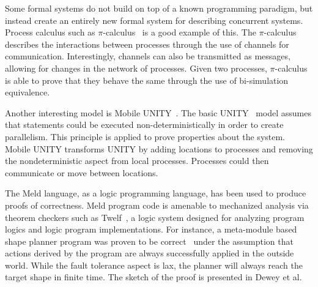 Some formal systems do not build on top of a known programming paradigm, but
instead create an entirely new formal system for describing concurrent systems.
Process calculus such as $\pi$-calculus~\cite{Milner:1999:CMS:329902} is a good
example of this.  The $\pi$-calculus describes the interactions between
processes through the use of channels for communication. Interestingly, channels
can also be transmitted as messages, allowing for changes in the network of
processes.  Given two processes, $\pi$-calculus is able to prove that they
behave the same through the use of bi-simulation equivalence.

Another interesting model is Mobile UNITY~\cite{Roman97anintroduction}. The
basic UNITY~\cite{UNITY} model assumes that statements could be executed
non-deterministically in order to create parallelism. This principle is applied
to prove properties about the system.  Mobile UNITY transforms UNITY by adding
locations to processes and removing the nondeterministic aspect from local
processes. Processes could then communicate or move between locations.

The Meld language, as a logic programming language, has been used to produce
proofs of correctness. Meld program code is amenable to mechanized analysis via
theorem checkers such as Twelf~\cite{twelf}, a logic system designed for
analyzing program logics and logic program implementations.  For instance, a
meta-module based shape planner program was proven to be
correct~\cite{dewey-iros08,ashley-rollman-iclp09} under the assumption that
actions derived by the program are always successfully applied in the outside
world.  While the fault tolerance aspect is lax, the planner will always reach
the target shape in finite time.  The sketch of the proof is presented in Dewey
et al.~\cite{dewey-iros08}

